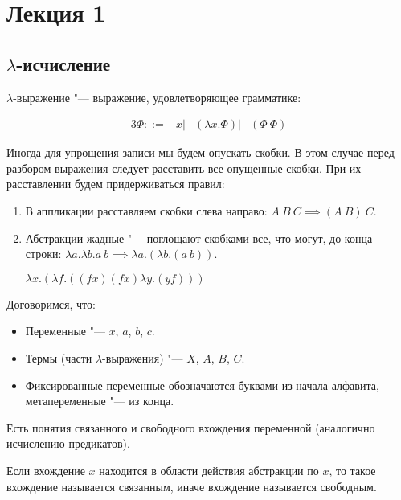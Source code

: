 \section{Лекция 1}

\subsection{$\lambda$-исчисление}

\begin{definition}
	$\lambda$-выражение "--- выражение, удовлетворяющее грамматике:
	\begin{bnf}
	\begin{alignat*}{3}
		\Phi ::= & x
		       | & \left(\lambda{}x.\Phi\right)
		       | & \left(\Phi \ \Phi\right)
	\end{alignat*}
	\end{bnf}
\end{definition}

Иногда для упрощения записи мы будем опускать скобки. В этом случае перед разбором выражения следует расставить все опущенные скобки. При их расставлении будем придерживаться правил:
\begin{enumerate}
	\item В аппликации расставляем скобки слева направо: $A \ B \ C \implies (A \ B) \ C$.
	\item Абстракции жадные "--- поглощают скобками все, что могут, до конца строки: 
	$\lambda{}a.\lambda{}b.a \ b \implies \lambda{}a.(\lambda{}b.(a \ b))$.
	\vspace{1mm}
	\begin{example}
		$\lambda{}x.(\lambda{}f.((f x) (f x) \lambda{}y.(y f)))$
	\end{example}
\end{enumerate}

Договоримся, что:
\begin{itemize}
	\item Переменные "--- $x$, $a$, $b$, $c$.
	\item Термы (части $\lambda$-выражения) "--- $X$, $A$, $B$, $C$.
	\item Фиксированные переменные обозначаются буквами из начала алфавита, метапеременные "--- из конца.
\end{itemize}

Есть понятия связанного и свободного вхождения переменной (аналогично исчислению предикатов).

\begin{definition}
	Если вхождение $x$ находится в области действия абстракции по $x$, то такое вхождение называется связанным, иначе вхождение называется свободным.
\end{definition}

